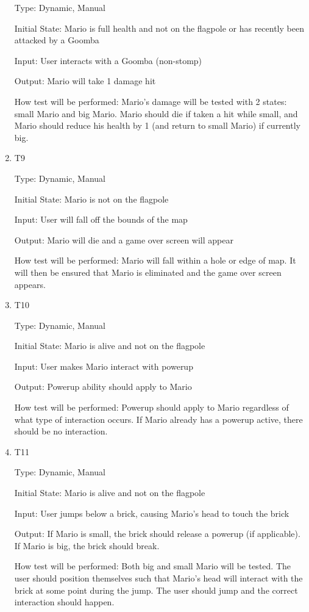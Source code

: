 \documentclass[12pt, titlepage]{article}
\begin{document}
\begin{enumerate}
Type: Dynamic, Manual

Initial State: Mario is full health and not on the flagpole or has recently been attacked by a Goomba

Input: User interacts with a Goomba (non-stomp)

Output: Mario will take 1 damage hit

How test will be performed: Mario's damage will be tested with 2 states: small Mario and big Mario. Mario should die if taken a hit while small, and Mario should reduce his health by 1 (and return to small Mario) if currently big.

\item{T9\\}

Type: Dynamic, Manual

Initial State: Mario is not on the flagpole

Input: User will fall off the bounds of the map

Output: Mario will die and a game over screen will appear

How test will be performed: Mario will fall within a hole or edge of map. It will then be ensured that Mario is eliminated and the game over screen appears.

\item{T10\\}

Type: Dynamic, Manual

Initial State: Mario is alive and not on the flagpole

Input: User makes Mario interact with powerup

Output: Powerup ability should apply to Mario

How test will be performed: Powerup should apply to Mario regardless of what type of interaction occurs. If Mario already has a powerup active, there should be no interaction.

\item{T11\\}

Type: Dynamic, Manual

Initial State: Mario is alive and not on the flagpole

Input: User jumps below a brick, causing Mario's head to touch the brick

Output: If Mario is small, the brick should release a powerup (if applicable). If Mario is big, the brick should break.

How test will be performed: Both big and small Mario will be tested. The user should position themselves such that Mario's head will interact with the brick at some point during the jump. The user should jump and the correct interaction should happen.


\end{enumerate}
\end{document}
